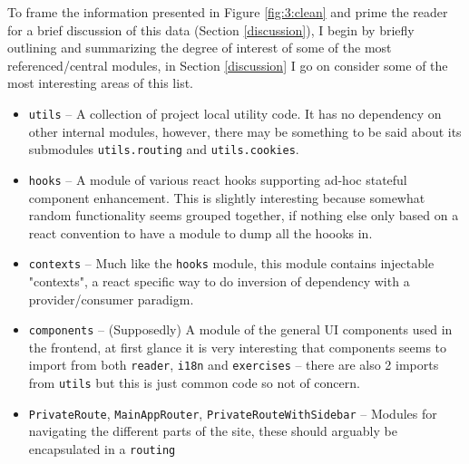 \documentclass{article}
\begin{document}
To frame the information presented in Figure \ref{fig:3:clean} and prime the reader 
for a brief discussion of this data (Section \ref{discussion}),
I begin by briefly outlining and summarizing the degree of interest of some of the most referenced/central modules,
in Section \ref{discussion} I go on consider some of the most interesting areas of this list.

\begin{itemize}
  \item \verb|utils| -- A collection of project local utility code.
                        It has no dependency on other internal modules, 
                        however, 
                        there may be something to be said about
                        its submodules \verb|utils.routing| and \verb|utils.cookies|.
  \item \verb|hooks| -- A module of various react hooks supporting ad-hoc stateful component enhancement.
                        This is slightly interesting because somewhat random functionality seems grouped together,
                        if nothing else only based on a react convention to have a module to dump all the hoooks in.
  \item \verb|contexts| -- Much like the \verb|hooks| module, this module contains injectable "contexts", 
                           a react specific way to do inversion of dependency with a provider/consumer paradigm.
  \item \verb|components| -- (Supposedly) A module of the general UI components used in the frontend,
                             at first glance it is very interesting that components seems to import from both \verb|reader|, \verb|i18n| and \verb|exercises| -- there are also 2 imports from \verb|utils| but this is just common code so not of concern.
  \item \verb|PrivateRoute|, \verb|MainAppRouter|, \verb|PrivateRouteWithSidebar| -- Modules for navigating the different parts of the site,
                                                                                     these should arguably be encapsulated in a \verb|routing|

\end{itemize}
\end{document}
